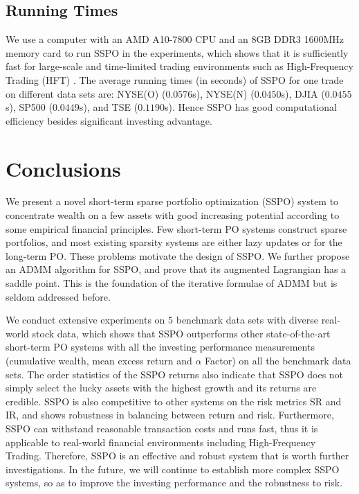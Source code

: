 \documentclass[twoside,11pt]{article}
\begin{document}
\subsection{Running Times}
\label{sec:comcost}
We use a computer with an AMD A10-7800 CPU and an 8GB DDR3 1600MHz memory card to run SSPO in the experiments, which shows that it is sufficiently fast for large-scale and time-limited trading environments such as High-Frequency Trading (HFT) \citep{HFT}. The average running times (in seconds) of SSPO for one trade on different data sets are: NYSE(O) ($0.0576$s), NYSE(N) ($0.0450$s), DJIA ($0.0455$s), SP500 ($0.0449$s), and TSE ($0.1190$s). Hence SSPO has good computational efficiency besides significant investing advantage.











\section{Conclusions}
\label{sec:conclusion}
We present a novel short-term sparse portfolio optimization (SSPO) system to concentrate wealth on a few assets with good increasing potential according to some empirical financial principles. Few short-term PO systems construct sparse portfolios, and most existing sparsity systems are either lazy updates or for the long-term PO. These problems motivate the design of SSPO. We further propose an ADMM algorithm for SSPO, and prove that its augmented Lagrangian has a saddle point. This is the foundation of the iterative formulae of ADMM but is seldom addressed before. 

We conduct extensive experiments on $5$ benchmark data sets with diverse real-world stock data, which shows that SSPO outperforms other state-of-the-art short-term PO systems with all the investing performance measurements (cumulative wealth, mean excess return and $\alpha$ Factor) on all the benchmark data sets. The order statistics of the SSPO returns also indicate that SSPO does not simply select the lucky assets with the highest growth and its returns are credible. SSPO is also competitive to other systems on the risk metrics SR and IR, and shows robustness in balancing between return and risk. Furthermore, SSPO can withstand reasonable transaction costs and runs fast, thus it is applicable to real-world financial environments including High-Frequency Trading. Therefore, SSPO is an effective and robust system that is worth further investigations. In the future, we will continue to establish more complex SSPO systems, so as to improve the investing performance and the robustness to risk.
\end{document}
